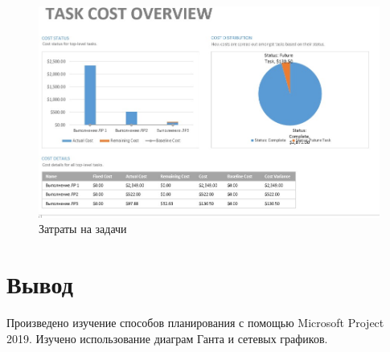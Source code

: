 \documentclass[a4paper, 14pt]{extarticle}
\begin{document}
\begin{enumerate}
    \begin{figure}[h]
        \centering
        \includegraphics[width=\textwidth]{img/S009.jpg}
        \caption{Затраты на задачи}%
        \label{img:report:task_cost}
    \end{figure}

\end{enumerate}

\section{Вывод}
Произведено изучение способов планирования с помощью Microsoft Project 2019. Изучено использование диаграм Ганта и сетевых графиков.

\StartAddons{}

\newpage
{}

\end{document}
